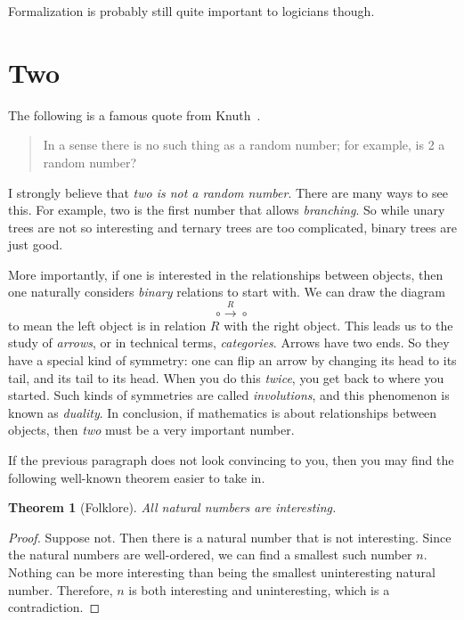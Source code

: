 \documentclass{bhamthesis}
\newtheorem*{thm}{Theorem}
\theoremstyle{definition}
\begin{document}
Formalization is probably still quite important to logicians
though.


\appendix
\chapter*{Two}
The following is a famous quote from
Knuth~\cite[Section~3.1]{book:ArtProgram}.
\begin{quotation}
 In a sense there is no such thing as a random number; for
 example, is 2 a random number?
\end{quotation}
I strongly believe that \emph{two is not a random number}.  There
are many ways to see this.  For example, two is the first number
that allows \emph{branching}.  So while unary trees are not so
interesting and ternary trees are too complicated, binary trees
are just good.

More importantly, if one is interested in the relationships
between objects, then one naturally considers \emph{binary}
relations to start with.  We can draw the diagram
\[ {\circ} \stackrel{R}{\longrightarrow} {\circ} \]
to mean the left object is in relation $R$ with the right object.
This leads us to the study of \emph{arrows}, or in technical
terms, \emph{categories}.  Arrows have two ends.  So they have a
special kind of symmetry: one can flip an arrow by changing its
head to its tail, and its tail to its head.  When you do this
\emph{twice}, you get back to where you started.  Such kinds of
symmetries are called \emph{involutions}, and this phenomenon is
known as \emph{duality}.  In conclusion, if mathematics is about
relationships between objects, then \emph{two} must be a very
important number.

If the previous paragraph does not look convincing to you, then
you may find the following well-known theorem easier to take in.

\begin{thm}[Folklore]
 All natural numbers are interesting.
\end{thm}

\begin{proof}
 Suppose not.  Then there is a natural number that is not
 interesting.  Since the natural numbers are well-ordered, we can
 find a smallest such number $n$.  Nothing can be more interesting
 than being the smallest uninteresting natural number.  Therefore,
 $n$ is both interesting and uninteresting, which is a
 contradiction.
\end{proof}


\backmatter

%

\end{document}
